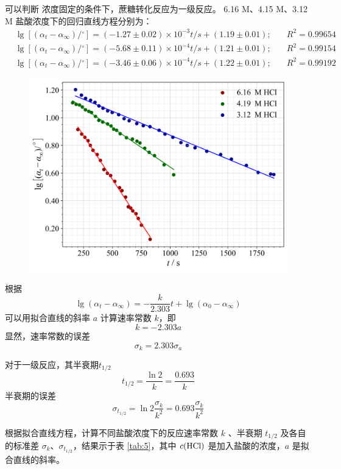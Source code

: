 可以判断  浓度固定的条件下，蔗糖转化反应为一级反应。 6.16 M、4.15 M、3.12 M 盐酸浓度下的回归直线方程分别为：
\begin{align*}
     &\lg \left[(\alpha_t-\alpha_{\infty})/{}^\circ\right] = (-1.27 \pm 0.02) \times 10^{-3}t/\si{s} + (1.19 \pm 0.01);\quad &R^2 = 0.99654 \\
     &\lg \left[(\alpha_t-\alpha_{\infty})/{}^\circ\right] = (-5.68 \pm 0.11) \times 10^{-4}t/\si{s} + (1.21 \pm 0.01);\quad &R^2 = 0.99154 \\
     &\lg \left[(\alpha_t-\alpha_{\infty})/{}^\circ\right] = (-3.46 \pm 0.06) \times 10^{-4}t/\si{s} + (1.22 \pm 0.01);\quad &R^2 = 0.99192
\end{align*}

\begin{figure}[htbp]
    \centering
    \includegraphics[width=.8\textwidth]{figures/2.png}
    \label{fig:2}
\end{figure}

根据
$$
\lg \left(\alpha_t-\alpha_{\infty}\right)=-\frac{k}{2.303} t+\lg \left(\alpha_0-\alpha_{\infty}\right)
$$
可以用拟合直线的斜率 $a$ 计算速率常数 $k$，即
$$
k=-2.303 a
$$
显然，速率常数的误差
$$
\sigma_k=2.303 \sigma_a
$$

对于一级反应，其半衰期$t_{1/2}$
$$
t_{1 / 2}=\frac{\ln 2}{k}=\frac{0.693}{k}
$$
半衰期的误差
$$
\sigma_{t_{1 / 2}}=\ln 2 \frac{\sigma_k}{k^2}=0.693 \frac{\sigma_k}{k^2}
$$

根据拟合直线方程，计算不同盐酸浓度下的反应速率常数 $k$ 、半衰期 $t_{1 / 2}$ 及各自的标准差 $\sigma_k $、$ \sigma_{t_{1 / 2}}$，结果示于表 \ref{tab:5}，其中 $c(\ce{HCl})$ 是加入盐酸的浓度，$a$ 是拟合直线的斜率。

